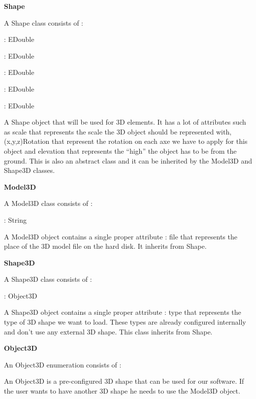 \textbf{Shape}

A Shape class consists of :
\begin{description}[labelindent=1cm]
  \item[scale]: EDouble
  \item[xRotation]: EDouble
  \item[yRotation]: EDouble
  \item[zRotation]: EDouble
  \item[elevation]: EDouble
\end{description}

A Shape object that will be used for 3D elements. It has a lot of attributes such as scale that represents the scale the 3D object should be represented with, (x,y,z)Rotation that represent the rotation on each axe we have to apply for this object and elevation that represents the ``high'' the object has to be from the ground. This is also an abstract class and it can be inherited by the Model3D and Shape3D classes.

\textbf{Model3D}

A Model3D class consists of : 
\begin{description}[labelindent=1cm]
  \item[file]: String
\end{description}

A Model3D object contains a single proper attribute : file that represents the place of the 3D model file on the hard disk. It inherits from Shape.

\textbf{Shape3D}

A Shape3D class consists of : 
\begin{description}[labelindent=1cm]
  \item[type]: Object3D
\end{description}

A Shape3D object contains a single proper attribute : type that represents the type of 3D shape we want to load. These types are already configured internally and don't use any external 3D shape. This class inherits from Shape.

\textbf{Object3D}

An Object3D enumeration consists of :
\begin{description}[labelindent=1cm]
  \item[Cube]
  \item[Sphere]
\end{description}

An Object3D is a pre-configured 3D shape that can be used for our software. If the user wants to have another 3D shape he needs to use the Model3D object.

